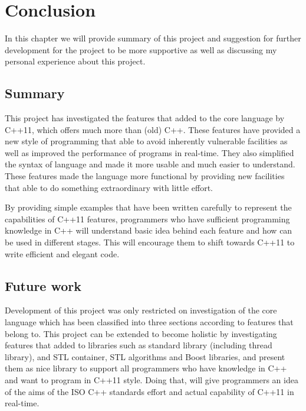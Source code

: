\documentclass[11pt]{report}
\begin{document}
\chapter{Conclusion}
\label{chapter: conclusion}
In this chapter we will provide summary of this project and suggestion for further development for the project to be more supportive as well as discussing my personal experience about this project.
\section{Summary}
\label{se : summary}
This project has investigated the features that added to the core language by C++11, which offers much more than (old) C++. These features have provided a new style of programming that able to avoid inherently vulnerable facilities as well as improved the performance of programs in real-time. They also simplified the syntax of language and made it more usable and much easier to understand. These features made the language more functional by providing new facilities that able to do something extraordinary with little effort.

By providing simple examples that have been written carefully to represent the capabilities of C++11 features, programmers who have sufficient programming knowledge in C++ will understand basic idea behind each feature and how can be used in different stages. This will encourage them to shift towards C++11 to write efficient and elegant code.

\section{Future work}
\label{sec: future work}
Development of this project was only restricted on investigation of the core language which has been classified into three sections according to features that belong to. This project can be extended to become holistic by investigating features that added to libraries such as standard library (including thread library), and STL container, STL algorithms and Boost libraries, and present them as nice library to support all programmers who have knowledge in C++ and want to program in C++11 style. Doing that, will give programmers an idea of the aims of the ISO C++ standards effort and actual capability of C++11 in real-time.
\end{document}
